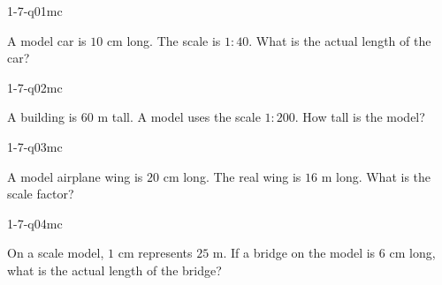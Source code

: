 

\begin{practiceQuestion}{1-7-q01}{mc}
\begin{questionText}
A model car is $10$ cm long. The scale is $1 : 40$. What is the actual length of the car?
\end{questionText}
\end{practiceQuestion}

\begin{practiceQuestion}{1-7-q02}{mc}
\begin{questionText}
A building is $60$ m tall. A model uses the scale $1 : 200$. How tall is the model?
\end{questionText}
\end{practiceQuestion}

\begin{practiceQuestion}{1-7-q03}{mc}
\begin{questionText}
A model airplane wing is $20$ cm long. The real wing is $16$ m long. What is the scale factor?
\end{questionText}
\end{practiceQuestion}

\begin{practiceQuestion}{1-7-q04}{mc}
\begin{questionText}
On a scale model, $1$ cm represents $25$ m. If a bridge on the model is $6$ cm long, what is the actual length of the bridge?
\end{questionText}
\end{practiceQuestion}

